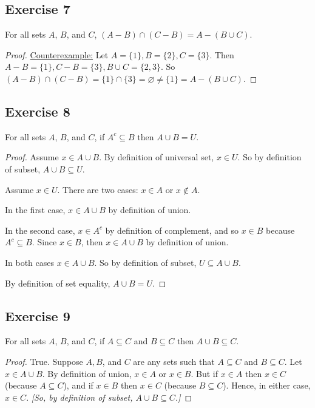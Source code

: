 \documentclass[14pt]{extarticle}
\newcommand{\es}{\varnothing}
\begin{document}
\subsection{Exercise 7}
For all sets $A$, $B$, and $C$, \((A - B) \cap (C - B) = A - (B \cup C)\).

\begin{proof}
  \underline{Counterexample:}
  Let \(A = \{1\}, B = \{2\}, C = \{3\}\). Then \(A-B= \{1\}, C - B = \{3\}, B \cup C = \{2, 3\}\).
  So \((A - B) \cap (C - B) = \{1\} \cap \{3\} = \es \neq \{1\} = A - (B \cup C)\).
\end{proof}

\subsection{Exercise 8}
For all sets $A$, $B$, and $C$, if \(A^c \subseteq B\) then \(A \cup B = U\).

\begin{proof}
  Assume \(x \in A \cup B\). By definition of universal set, \(x \in U\).
  So by definition of subset, \(A \cup B \subseteq U\).

  Assume \(x \in U\). There are two cases: $x \in A$ or $x \notin A$.

  In the first case, $x \in A \cup B$ by definition of union.

  In the second case, $x \in A^c$ by definition of complement, and so $x \in B$ because \(A^c \subseteq B\).
  Since $x \in B$, then \(x \in A \cup B\) by definition of union.

  In both cases \(x \in A \cup B\). So by definition of subset, \(U \subseteq A \cup B\).

  By definition of set equality, \(A \cup B = U\).
\end{proof}

\subsection{Exercise 9}
For all sets $A$, $B$, and $C$, if \(A \subseteq C\) and \(B \subseteq C\) then \(A \cup B \subseteq C\).

\begin{proof}
  True. Suppose $A, B$, and $C$ are any sets such that \(A \subseteq C\) and \(B \subseteq C\). Let \(x \in A \cup B\).
  By definition of union, \(x \in A\) or \(x \in B\). But if \(x \in A\) then \(x \in C\) (because \(A \subseteq C\)),
  and if \(x \in B\) then \(x \in C\) (because \(B \subseteq C\)). Hence, in either case, \(x \in C\). {\it [So, by
        definition of subset, \(A \cup B \subseteq C\).]}
\end{proof}
\end{document}
